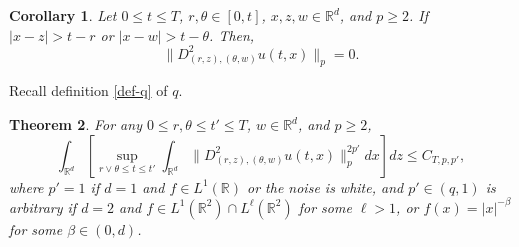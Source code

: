 \documentclass[12pt]{article}
\newtheorem{theorem}{Theorem}[section]
\newtheorem{corollary}[theorem]{Corollary}
\def\bR{\mathbb{R}}
\begin{document}
\begin{corollary}
\label{D2u-support}
Let $0\leq t \leq T$, $r,\theta \in [0,t]$, $x,z,w \in \bR^d$, and $p \geq 2$. If $|x-z| > t-r$ or $|x-w| > t - \theta$. Then, 
\[
\|D_{(r,z),(\theta,w)}^2u(t,x)\|_p = 0. 
\]
\end{corollary}

Recall definition \eqref{def-q} of $q$.


\begin{theorem}
\label{key-D2u-int}
For any $0\leq r,\theta \leq t' \leq T$, $w \in \bR^d$,  and $p\geq 2$,
\[
\int_{\bR^d} \left[ \sup_{r \vee \theta \leq t \leq t'} \int_{\bR^d} \|D_{(r,z),(\theta,w)}^2u(t,x)\|^{2p'}_p dx \right] dz \leq C_{T,p,p'},
\]
where $p'=1$ if $d=1$ and $f \in L^1(\bR)$ or the noise is white, and  $p' \in (q,1)$ is arbitrary if $d=2$ and $f \in L^1(\bR^2) \cap L^{\ell}(\bR^2)$ for some $\ell>1$, or $f(x)=|x|^{-\beta}$ for some $\beta \in (0,d)$.

\end{theorem}
\end{document}
